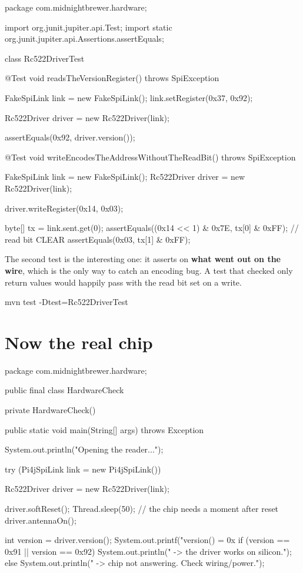 \begin{jcode}
package com.midnightbrewer.hardware;

import org.junit.jupiter.api.Test;
import static org.junit.jupiter.api.Assertions.assertEquals;

class Rc522DriverTest {

    @Test
    void readsTheVersionRegister() throws SpiException {
        FakeSpiLink link = new FakeSpiLink();
        link.setRegister(0x37, 0x92);

        Rc522Driver driver = new Rc522Driver(link);

        assertEquals(0x92, driver.version());
    }

    @Test
    void writeEncodesTheAddressWithoutTheReadBit() throws SpiException {
        FakeSpiLink link = new FakeSpiLink();
        Rc522Driver driver = new Rc522Driver(link);

        driver.writeRegister(0x14, 0x03);

        byte[] tx = link.sent.get(0);
        assertEquals((0x14 << 1) & 0x7E, tx[0] & 0xFF);   // read bit CLEAR
        assertEquals(0x03, tx[1] & 0xFF);
    }
}
\end{jcode}

The second test is the interesting one: it asserts on \textbf{what went out on
the wire}, which is the only way to catch an encoding bug. A test that checked
only return values would happily pass with the read bit set on a write.

\begin{verifybox}
\begin{shell}
mvn test -Dtest=Rc522DriverTest
\end{shell}
\end{verifybox}

\section{Now the real chip}

\begin{jcode}
package com.midnightbrewer.hardware;

public final class HardwareCheck {

    private HardwareCheck() { }

    public static void main(String[] args) throws Exception {
        System.out.println("Opening the reader...");

        try (Pi4jSpiLink link = new Pi4jSpiLink()) {
            Rc522Driver driver = new Rc522Driver(link);

            driver.softReset();
            Thread.sleep(50);              // the chip needs a moment after reset
            driver.antennaOn();

            int version = driver.version();
            System.out.printf("version() = 0x%
            if (version == 0x91 || version == 0x92) {
                System.out.println("  -> the driver works on silicon.");
            } else {
                System.out.println("  -> chip not answering. Check wiring/power.");
            }
        }
    }
}
\end{jcode}

